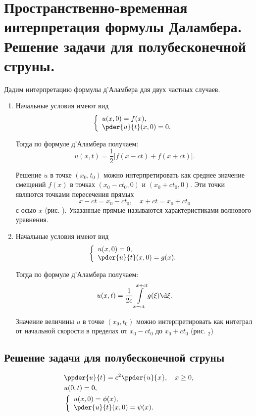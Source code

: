 \chapter{Пространственно-временная интерпретация формулы Даламбера. Решение
задачи для полубесконечной струны.}

Дадим интерпретацию формулы д'Аламбера для двух частных случаев.
\begin{enumerate}
    \item Начальные условия имеют вид
    \[
        \left\{ \begin{array}{l}
            u(x, 0) = f(x), \\
            \ds \pder{u}{t}(x, 0) = 0.
        \end{array} \right.
    \]
    
    Тогда по формуле д'Аламбера получаем:
    \[
        u(x, t) = \frac{1}{2}\bigl[f(x - ct) + f(x + ct)\bigr].
    \]
    
    Решение \( u \) в точке \( (x_0, t_0) \) можно интерпретировать как среднее
    значение смещений \( f(x) \) в точках \( (x_0 - ct_0, 0) \) и
    \( (x_0 + ct_0, 0) \). Эти точки являются точками пересечения прямых
    \[
        x - ct = x_0 - ct_0, \quad x + ct = x_0 + ct_0
    \]
    с осью \( x \) (рис. \smiley). Указанные прямые называются характеристиками волнового
    уравнения.
    
    \item Начальные условия имеют вид
    \[
        \left\{ \begin{array}{l}
            u(x, 0) = 0, \\
            \ds \pder{u}{t}(x, 0) = g(x).
        \end{array} \right.
    \]
    
    Тогда по формуле д'Аламбера получаем:
    \[
        u(x, t) = \frac{1}{2c}\int\limits_{x - ct}^{x + ct} g(\xi)\d\xi.
    \]
    
    Значение величины \( u \) в точке \( (x_0, t_0) \) можно интерпретировать
    как интеграл от начальной скорости в пределах от \( x_0 - ct_0 \) до
    \( x_0 + ct_0 \) (рис. \smiley\(_2\))
\end{enumerate}

\section{Решение задачи для полубесконечной струны}
\begin{align*}
    & \ppder{u}{t} = c^2\ppder{u}{x}, \quad x \ge 0, \\
    & u(0, t) = 0, \\
    & \left\{ \begin{array}{l}
        u(x, 0) = \phi(x), \\
        \ds \pder{u}{t}(x, 0) = \psi(x).
    \end{array} \right.
\end{align*}

